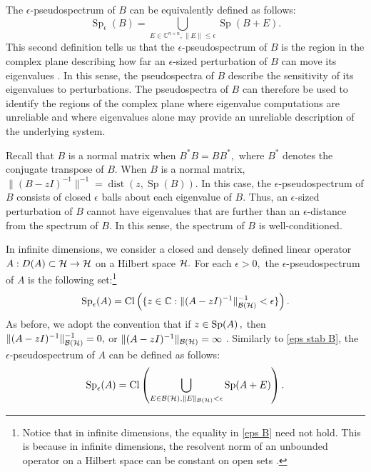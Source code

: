 The $\epsilon$-pseudospectrum of $B$ can be equivalently defined as follows:
\begin{equation} \label{eps stab B}
    \operatorname{Sp}_{\epsilon}(B) = \bigcup_{E \in \mathbb{C}^{n\times n}, \|E\| \le \epsilon} \operatorname{Sp}(B+E).
\end{equation}
This second definition tells us that the $\epsilon$-pseudospectrum of $B$ is the region in the complex plane describing how far an $\epsilon$-sized perturbation of $B$ can move its eigenvalues \cite[Section~1.1.4]{Matt}. In this sense, the pseudospectra of $B$ describe the sensitivity of its eigenvalues to perturbations. The pseudospectra of $B$ can therefore be used to identify the regions of the complex plane where eigenvalue computations are unreliable and where eigenvalues alone may provide an unreliable description of the underlying system.

Recall that $B$ is a normal matrix when $B^*B=BB^*,$ where $B^*$ denotes the conjugate transpose of $B.$ When $B$ is a normal matrix, $\|(B-zI)^{-1}\|^{-1} = \operatorname{dist}(z,\operatorname{Sp}(B)).$ In this case, the $\epsilon$-pseudospectrum of $B$ consists of closed $\epsilon$ balls about each eigenvalue of $B.$ Thus, an $\epsilon$-sized perturbation of $B$ cannot have eigenvalues that are further than an $\epsilon$-distance from the spectrum of $B.$ In this sense, the spectrum of $B$ is well-conditioned.  


In infinite dimensions, we consider a closed and densely defined linear operator $A : D(A) \subset \mathcal{H} \rightarrow 
\mathcal{H}$ on a Hilbert space $\mathcal{H}.$ For each $\epsilon>0,$ the $\epsilon$-pseudospectrum of $A$ is the following set:\footnote{Notice that in infinite dimensions, the equality in \eqref{eps B} need not hold. This is because in infinite dimensions, the resolvent norm of an unbounded operator on a Hilbert space can be constant on open sets \cite[Section~1.1.4]{Matt}.}
\begin{equation}
    \operatorname{Sp}_{\epsilon}\!\left(A\right) = \operatorname{Cl}\left( \{ z \in \mathbb{C} : \|(A-zI)^{-1}\|_{\mathcal{B}(\mathcal{H})}^{-1} < \epsilon \}  \right).
\end{equation}
As before, we adopt the convention that if $z \in \operatorname{Sp}\!\left(A\right),$ then $\|(A-zI)^{-1}\|_{\mathcal{B}(\mathcal{H})}^{-1} = 0,$ or $\|(A-zI)^{-1}\|_{\mathcal{B}(\mathcal{H})} = \infty$ \cite[Section~1.1.4]{Matt}.
Similarly to \eqref{eps stab B}, the $\epsilon$-pseudospectrum of $A$ can be defined as follows:
\begin{equation} 
    \operatorname{Sp}_{\epsilon}\!\left(A\right) = \operatorname{Cl} \left( \bigcup_{E \in \mathcal{B}(\mathcal{H}), \|E\|_{\mathcal{B}(\mathcal{H})} < \epsilon} \operatorname{Sp}(A+E) \right).
\end{equation}

